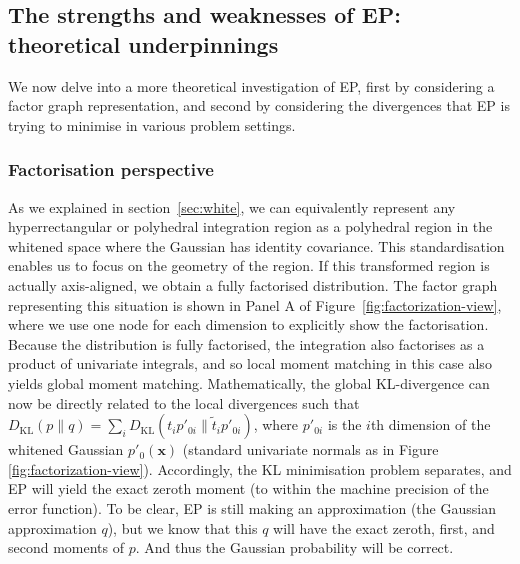 \documentclass[twoside,11pt]{article}
\def\x{{\mathbf x}}
\newcommand{\KL}{\text{KL}}
\begin{document}
\subsection{The strengths and weaknesses of EP: theoretical underpinnings}

We now delve into a more theoretical investigation of EP, first by considering a factor graph representation, and second by considering the divergences that EP is trying to minimise in various problem settings.

\subsubsection{Factorisation perspective}

As we explained in section~\ref{sec:white}, we can equivalently represent any hyperrectangular or polyhedral integration region as a polyhedral region in the whitened space where the Gaussian has identity covariance. This standardisation enables us to focus on the geometry of the region.  If this transformed region is actually axis-aligned, we obtain a fully factorised distribution. The factor graph representing this situation is shown in Panel A of Figure~\ref{fig:factorization-view}, where we use one node for each dimension to explicitly show the factorisation. Because the distribution is fully factorised, the integration also factorises as a product of univariate integrals, and so local moment matching in this case also yields global moment matching.   Mathematically, the global KL-divergence can now be directly related to the local divergences such that $D_\KL(p\| q) = \sum_i D_\KL(t_i p'_{0i}\| \tilde{t}_i p'_{0i})$, where $p'_{0i}$ is the $i$th dimension of the whitened Gaussian $p'_0(\x)$ (standard univariate normals as in Figure \ref{fig:factorization-view}).  Accordingly, the KL minimisation problem separates, and EP will yield the exact zeroth moment (to within the machine precision of the error function).  To be clear, EP is still making an approximation (the Gaussian approximation $q$), but we know that this $q$ will have the exact zeroth, first, and second moments of $p$.  And thus the Gaussian probability will be correct.
\end{document}
